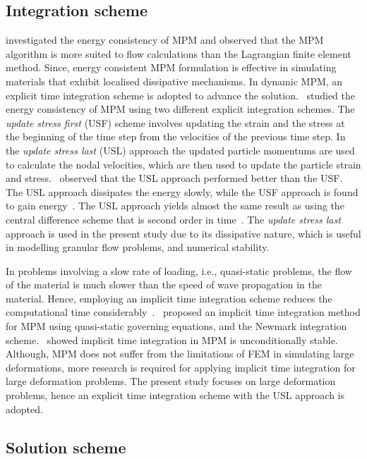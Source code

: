 \subsection{Integration scheme}

\citet{Love2006} investigated the energy consistency of MPM and observed that 
the MPM algorithm is more suited to flow calculations than the Lagrangian 
finite element method. Since, energy consistent MPM formulation is effective 
in simulating materials that exhibit localised dissipative mechanisms. In 
dynamic MPM, an explicit time integration scheme is 
adopted to advance the solution.~\citet{Bardenhagen2002} studied the energy 
consistency of MPM using two different explicit integration schemes. The 
\textit{update stress first} (USF) scheme involves updating the strain and the 
stress at the beginning of the time step from the velocities of the previous 
time step. In the \textit{update stress last} (USL) approach the updated 
particle momentums are used to calculate the nodal velocities, which are then 
used to update the particle strain and stress.~\citet{Bardenhagen2002} observed 
that the USL approach performed better 
than the USF. The USL approach dissipates the energy slowly, while the USF 
approach is found to gain energy~\citep{Kafaji2013}. The USL approach yields 
almost the same result as using the central difference scheme that is second 
order in time~\citep{Wallstedt2008}. The \textit{update stress last} approach 
is used in the present study due to its dissipative nature, which is useful in 
modelling granular flow problems, and numerical stability.

In problems involving a slow rate of loading, i.e., quasi-static problems, the 
flow of the material is much slower than the speed of wave propagation in the 
material. Hence, employing an implicit time integration scheme reduces the 
computational time considerably~\citep{Kafaji2013}.~\citet{Guilkey2003a} 
proposed an implicit time integration method for MPM using quasi-static 
governing equations, and the Newmark integration scheme.~\citet{Love2006} 
showed implicit time integration in MPM is unconditionally stable. 
Although, MPM does not suffer from the limitations of FEM in simulating large 
deformations, more research is required for applying implicit time integration 
for large deformation problems. The present study focuses on large deformation 
problems, hence an explicit time integration scheme with the USL approach is 
adopted.

\subsection{Solution scheme}

